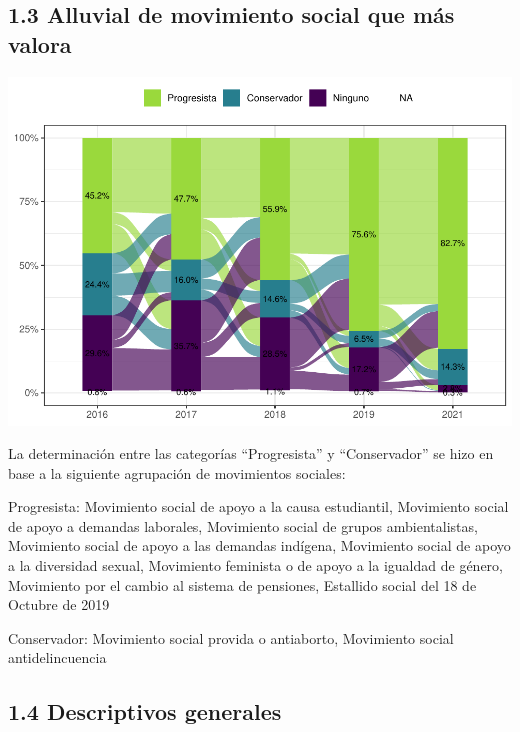 \documentclass[
  12pt,
  openany]{book}
\begin{document}
\hypertarget{alluvial-de-movimiento-social-que-muxe1s-valora}{%
\subsection{1.3 Alluvial de movimiento social que más valora}\label{alluvial-de-movimiento-social-que-muxe1s-valora}}

\includegraphics{reporte-elsoc_files/figure-latex/unnamed-chunk-8-1.pdf}

La determinación entre las categorías ``Progresista'' y ``Conservador'' se hizo en base a la siguiente agrupación de movimientos sociales:

Progresista: Movimiento social de apoyo a la causa estudiantil, Movimiento social de apoyo a demandas laborales, Movimiento social de grupos ambientalistas, Movimiento social de apoyo a las demandas indígena, Movimiento social de apoyo a la diversidad sexual, Movimiento feminista o de apoyo a la igualdad de género, Movimiento por el cambio al sistema de pensiones, Estallido social del 18 de Octubre de 2019

Conservador: Movimiento social provida o antiaborto, Movimiento social antidelincuencia

\hypertarget{descriptivos-generales}{%
\subsection{1.4 Descriptivos generales}\label{descriptivos-generales}}
\end{document}
